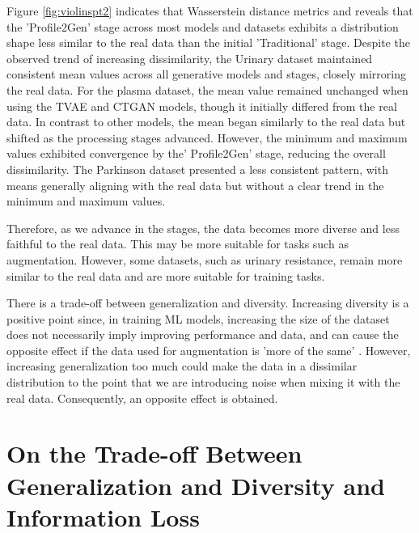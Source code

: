 \documentclass{article}
\theoremstyle{plain}
\theoremstyle{definition}
\theoremstyle{remark}
\begin{document}
Figure \ref{fig:violinspt2}  indicates that Wasserstein distance metrics and reveals that the 'Profile2Gen' stage across most models and datasets exhibits a distribution shape less similar to the real data than the initial 'Traditional' stage. Despite the observed trend of increasing dissimilarity, the Urinary dataset maintained consistent mean values across all generative models and stages, closely mirroring the real data. For the plasma dataset, the mean value remained unchanged when using the TVAE and CTGAN models, though it initially differed from the real data. In contrast to other models, the mean began similarly to the real data but shifted as the processing stages advanced. However, the minimum and maximum values exhibited convergence by the' Profile2Gen' stage, reducing the overall dissimilarity. The Parkinson dataset presented a less consistent pattern, with means generally aligning with the real data but without a clear trend in the minimum and maximum values.

Therefore, as we advance in the stages, the data becomes more diverse and less faithful to the real data. This may be more suitable for tasks such as augmentation. However, some datasets, such as urinary resistance, remain more similar to the real data and are more suitable for training tasks.

There is a trade-off between generalization and diversity. Increasing diversity is a positive point since, in training ML models, increasing the size of the dataset does not necessarily imply improving performance and data, and can cause the opposite effect if the data used for augmentation is 'more of the same' \cite{BAILLY2022106504}. However, increasing generalization too much could make the data in a dissimilar distribution to the point that we are introducing noise when mixing it with the real data. Consequently, an opposite effect is obtained.

\section{ On the Trade-off Between Generalization and Diversity and Information Loss}\label{appsec:tradeoff}
\end{document}
